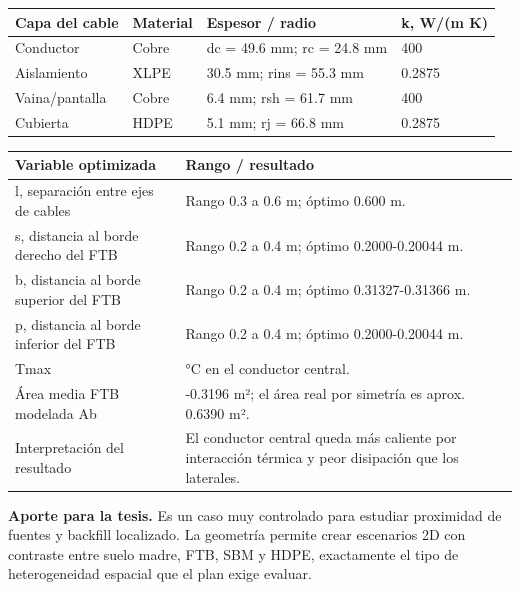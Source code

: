 \documentclass[11pt,a4paper,oneside]{report}
\begin{document}
\begin{longtable}[]{@{}llll@{}}
\toprule\noalign{}
Capa del cable & Material & Espesor / radio & k, W/(m K) \\
\midrule\noalign{}
\endhead
\bottomrule\noalign{}
\endlastfoot
Conductor & Cobre & dc = 49.6 mm; rc = 24.8 mm & 400 \\
Aislamiento & XLPE & 30.5 mm; rins = 55.3 mm & 0.2875 \\
Vaina/pantalla & Cobre & 6.4 mm; rsh = 61.7 mm & 400 \\
Cubierta & HDPE & 5.1 mm; rj = 66.8 mm & 0.2875 \\
\end{longtable}

\begin{longtable}[]{@{}
  >{\raggedright\arraybackslash}p{}
  >{\raggedright\arraybackslash}p{}@{}}
\toprule\noalign{}
\begin{minipage}[b]{\linewidth}\raggedright
Variable optimizada
\end{minipage} & \begin{minipage}[b]{\linewidth}\raggedright
Rango / resultado
\end{minipage} \\
\midrule\noalign{}
\endhead
\bottomrule\noalign{}
\endlastfoot
l, separación entre ejes de cables & Rango 0.3 a 0.6 m; óptimo 0.600
m. \\
s, distancia al borde derecho del FTB & Rango 0.2 a 0.4 m; óptimo
0.2000-0.20044 m. \\
b, distancia al borde superior del FTB & Rango 0.2 a 0.4 m; óptimo
0.31327-0.31366 m. \\
p, distancia al borde inferior del FTB & Rango 0.2 a 0.4 m; óptimo
0.2000-0.20044 m. \\
Tmax & 65 °C en el conductor central. \\
Área media FTB modelada Ab & 0.3195-0.3196 m²; el área real por simetría
es aprox. 0.6390 m². \\
Interpretación del resultado & El conductor central queda más caliente
por interacción térmica y peor disipación que los laterales. \\
\end{longtable}

\textbf{Aporte para la tesis.} Es un caso muy controlado para estudiar
proximidad de fuentes y backfill localizado. La geometría permite crear
escenarios 2D con contraste entre suelo madre, FTB, SBM y HDPE,
exactamente el tipo de heterogeneidad espacial que el plan exige
evaluar.
\end{document}

